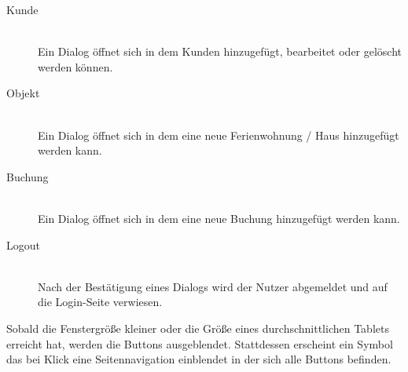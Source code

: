 \begin{minipage}{0.6\textwidth}
\begin{description}
\item[Kunde]\hfill \\
Ein Dialog öffnet sich in dem Kunden hinzugefügt, bearbeitet oder gelöscht werden können.
\item[Objekt]\hfill \\
Ein Dialog öffnet sich in dem eine neue Ferienwohnung / Haus hinzugefügt werden kann.
\item[Buchung]\hfill \\
Ein Dialog öffnet sich in dem eine neue Buchung hinzugefügt werden kann.
\item[Logout]\hfill \\
Nach der Bestätigung eines Dialogs wird der Nutzer abgemeldet und auf die Login-Seite verwiesen.
\end{description}

Sobald die Fenstergröße kleiner oder die Größe eines durchschnittlichen Tablets erreicht hat, werden die Buttons ausgeblendet. Stattdessen erscheint ein Symbol das bei Klick eine Seitennavigation einblendet in der sich alle Buttons befinden.
\end{minipage}
\hspace{0.05\textwidth}
